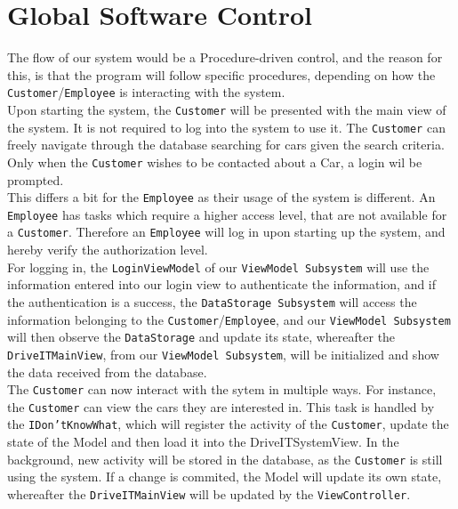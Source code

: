 \section{Global Software Control}

The flow of our system would be a Procedure-driven control, and the reason for this, is that the program will follow specific procedures, depending on how the \texttt{Customer}/\texttt{Employee} is interacting with the system.\\

Upon starting the system, the \texttt{Customer} will be presented with the main view of the system. It is not required to log into the system to use it. The \texttt{Customer} can freely navigate through the database searching for cars given the search criteria. Only when the \texttt{Customer} wishes to be contacted about a Car, a login wil be prompted.\\ 

This differs a bit for the \texttt{Employee} as their usage of the system is different. An \texttt{Employee} has tasks which require a higher access level, that are not available for a \texttt{Customer}. Therefore an \texttt{Employee} will log in upon starting up the system, and hereby verify the authorization level.\\

For logging in, the \texttt{LoginViewModel} of our \texttt{ViewModel Subsystem} will use the information entered into our login view to authenticate the information, and if the authentication is a success, the \texttt{DataStorage Subsystem} will access the information belonging to the \texttt{Customer}/\texttt{Employee}, and our \texttt{ViewModel Subsystem} will then observe the \texttt{DataStorage} and update its state, whereafter the \texttt{DriveITMainView}, from our \texttt{ViewModel Subsystem}, will be initialized and show the data received from the database.\\

The \texttt{Customer} can now interact with the sytem in multiple ways. For instance, the \texttt{Customer} can view the cars they are interested in. This task is handled by the \texttt{IDon'tKnowWhat}, which will register the activity of the \texttt{Customer}, update the state of the Model and then load it into the DriveITSystemView. In the background, new activity will be stored in the database, as the \texttt{Customer} is still using the system. If a change is commited, the Model will update its own state, whereafter the \texttt{DriveITMainView} will be updated by the \texttt{ViewController}.\\


